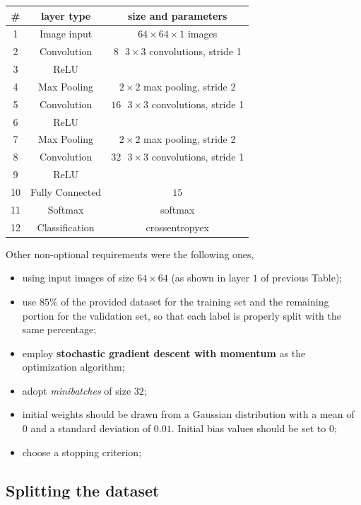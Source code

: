 \documentclass[a4paper, 11pt]{article} %
\begin{document}
\begin{center}
\begin{tabular}{|c|c|c|}
\hline 
\# & layer type & size and parameters \\
\hline \hline 
1 & Image input & $64 \times 64 \times 1$ images \\
\hline 
2 & Convolution & $8 \mbox{ } 3 \times 3$ convolutions, stride 1 \\
\hline 
3 & ReLU &  \\
\hline 
4 & Max Pooling & $2 \times 2$ max pooling, stride 2 \\
\hline
5 & Convolution & $16 \mbox{ } 3 \times 3$ convolutions, stride 1 \\
\hline 
6 & ReLU &  \\
\hline 
7 & Max Pooling & $2 \times 2$ max pooling, stride 2 \\
\hline
8 & Convolution & $32 \mbox{ } 3 \times 3$ convolutions, stride 1 \\
\hline 
9 & ReLU & \\
\hline 
10 & Fully Connected & $15$ \\
\hline
11 & Softmax & softmax \\ 
\hline \hline 
12 & Classification & crossentropyex \\
\hline
\end{tabular}
\end{center}
\bigskip

Other non-optional requirements were the following ones,

\begin{itemize}
    \item using input images of size $64 \times 64$ (as shown in layer $1$ of previous Table);
    \item use $85\%$ of the provided dataset for the training set and the remaining portion for the validation set, so that each label is properly split with the same percentage;
    \item employ \textbf{stochastic gradient descent with momentum} as the optimization algorithm;
    \item adopt \emph{minibatches} of size $32$;
    \item initial weights should be drawn from a Gaussian distribution with a mean of $0$ and a standard deviation of $0.01$. Initial bias values should be set to $0$;
    \item choose a stopping criterion;
\end{itemize}

\subsection{Splitting the dataset}
\end{document}
